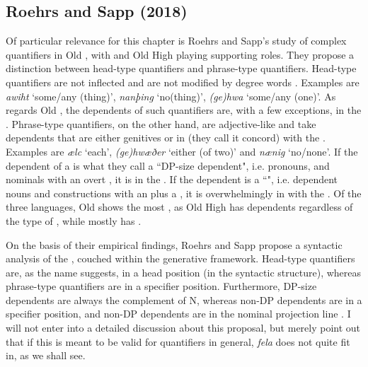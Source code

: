 \documentclass[output=paper,colorlinks,citecolor=brown]{langscibook}
\begin{document}
\subsection{Roehrs and Sapp (2018)}\label{ssect:RoehrsSapp}
Of particular relevance for this chapter is Roehrs and Sapp's \citeyearpar{RoehrsSapp18} study of complex quantifiers in Old , with  and Old High  playing supporting roles. They propose a distinction between head-type quantifiers and phrase-type quantifiers. Head-type quantifiers are not inflected and are not modified by degree words \citeyearpar[389]{RoehrsSapp18}. Examples are \textit{awiht} ‘some/any (thing)’, \textit{nanþing} ‘no(thing)’,\textit{ (ge)hwa }‘some/any (one)’. As regards Old , the dependents of such quantifiers are, with a few exceptions, in the  \citeyearpar[390]{RoehrsSapp18}. Phrase-type quantifiers, on the other hand, are adjective-like \citeyearpar[398]{RoehrsSapp18} and take dependents that are either genitives or in  (they call it concord) with the  \citeyearpar[399--401]{RoehrsSapp18}. Examples are \textit{ælc} ‘each’, \textit{(ge)hwæðer} ‘either (of two)’ and \textit{nænig} ‘no/none’. If the dependent of a  is what they call a “DP-size dependent", i.e. pronouns, and nominals with an overt  \citeyearpar[388]{RoehrsSapp18}, it is in the  \citeyearpar[399]{RoehrsSapp18}. If the dependent is a “", i.e. dependent nouns and constructions with an  plus a  \citeyearpar[388]{RoehrsSapp18}, it is overwhelmingly in  with the  \citeyearpar[399--401]{RoehrsSapp18}. Of the three languages, Old  shows the most , as Old High  has  dependents regardless of the type of , while  mostly has .  

On the basis of their empirical findings, Roehrs and Sapp propose a syntactic analysis of the , couched within the generative framework. Head-type quantifiers are, as the name suggests, in a head position (in the syntactic structure), whereas phrase-type quantifiers are in a specifier position. Furthermore, DP-size dependents are always the complement of N, whereas non-DP  dependents are in a specifier position, and non-DP  dependents are in the nominal projection line \citeyearpar[381, 396, 398, 404]{RoehrsSapp18}. I will not enter into a detailed discussion about this proposal, but merely point out that if this is meant to be valid for quantifiers in general, \textit{fela} does not quite fit in, as we shall see.
\end{document}

